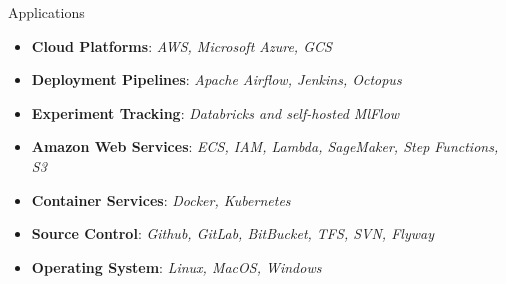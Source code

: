 \vspace*{0.01 in}

\Technology
{Applications}
{\faLinux}
{\begin{itemize}
    \item \textbf{Cloud Platforms}:
      \emph{AWS, Microsoft Azure, GCS}
    \item \textbf{Deployment Pipelines}:
    \emph{Apache Airflow, Jenkins, Octopus}
    \item \textbf{Experiment Tracking}:
      \emph{Databricks and self-hosted MlFlow}
    \item \textbf{Amazon Web Services}:
      \emph{ECS, IAM, Lambda, SageMaker, Step Functions, S3}
    \item \textbf{Container Services}:
      \emph{Docker, Kubernetes}
    \item \textbf{Source Control}:
      \emph{Github, GitLab, BitBucket, TFS, SVN, Flyway}
    \item \textbf{Operating System}:
      \emph{Linux, MacOS, Windows}
\end{itemize}}